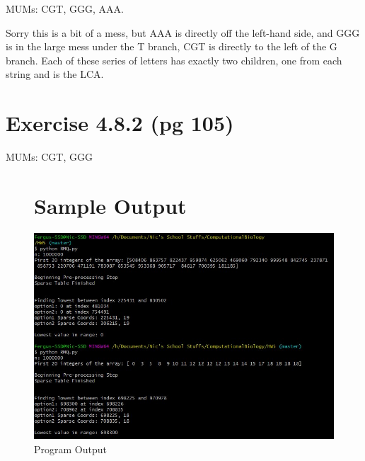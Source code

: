 \documentclass{article}
\begin{document}
MUMs: {CGT, GGG, AAA}.

Sorry this is a bit of a mess, but AAA is directly off the left-hand side, and GGG is in the large mess under the T branch, CGT is directly to the left of the G branch. Each of these series of letters has exactly two children, one from each string and is the LCA.
\section{Exercise 4.8.2 (pg 105)}
MUMs: {CGT, GGG}

\begin{figure}
	\section{Sample Output}
    \includegraphics[width=\textwidth,center]{HW5_SampleOutput.jpg}
    \caption{Program Output}
\end{figure}
\end{document}
